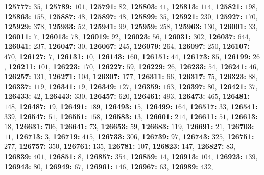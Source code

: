 \textsf{\bfseries 125777:} $35$, \textsf{\bfseries 125789:} $101$, \textsf{\bfseries 125791:} $82$, \textsf{\bfseries 125803:} $41$, \textsf{\bfseries 125813:} $114$, \textsf{\bfseries 125821:} $198$, \textsf{\bfseries 125863:} $155$, \textsf{\bfseries 125887:} $48$, \textsf{\bfseries 125897:} $48$, \textsf{\bfseries 125899:} $35$, \textsf{\bfseries 125921:} $230$, \textsf{\bfseries 125927:} $170$, \textsf{\bfseries 125929:} $378$, \textsf{\bfseries 125933:} $52$, \textsf{\bfseries 125941:} $99$, \textsf{\bfseries 125959:} $258$, \textsf{\bfseries 125963:} $130$, \textsf{\bfseries 126001:} $33$, \textsf{\bfseries 126011:} $7$, \textsf{\bfseries 126013:} $78$, \textsf{\bfseries 126019:} $92$, \textsf{\bfseries 126023:} $56$, \textsf{\bfseries 126031:} $302$, \textsf{\bfseries 126037:} $644$, \textsf{\bfseries 126041:} $237$, \textsf{\bfseries 126047:} $30$, \textsf{\bfseries 126067:} $245$, \textsf{\bfseries 126079:} $264$, \textsf{\bfseries 126097:} $250$, \textsf{\bfseries 126107:} $470$, \textsf{\bfseries 126127:} $7$, \textsf{\bfseries 126131:} $10$, \textsf{\bfseries 126143:} $160$, \textsf{\bfseries 126151:} $44$, \textsf{\bfseries 126173:} $85$, \textsf{\bfseries 126199:} $26$, \textsf{\bfseries 126211:} $101$, \textsf{\bfseries 126223:} $170$, \textsf{\bfseries 126227:} $59$, \textsf{\bfseries 126229:} $26$, \textsf{\bfseries 126233:} $54$, \textsf{\bfseries 126241:} $46$, \textsf{\bfseries 126257:} $131$, \textsf{\bfseries 126271:} $104$, \textsf{\bfseries 126307:} $177$, \textsf{\bfseries 126311:} $66$, \textsf{\bfseries 126317:} $75$, \textsf{\bfseries 126323:} $88$, \textsf{\bfseries 126337:} $119$, \textsf{\bfseries 126341:} $19$, \textsf{\bfseries 126349:} $127$, \textsf{\bfseries 126359:} $163$, \textsf{\bfseries 126397:} $80$, \textsf{\bfseries 126421:} $37$, \textsf{\bfseries 126433:} $42$, \textsf{\bfseries 126443:} $330$, \textsf{\bfseries 126457:} $620$, \textsf{\bfseries 126461:} $493$, \textsf{\bfseries 126473:} $465$, \textsf{\bfseries 126481:} $148$, \textsf{\bfseries 126487:} $19$, \textsf{\bfseries 126491:} $189$, \textsf{\bfseries 126493:} $15$, \textsf{\bfseries 126499:} $164$, \textsf{\bfseries 126517:} $33$, \textsf{\bfseries 126541:} $339$, \textsf{\bfseries 126547:} $51$, \textsf{\bfseries 126551:} $158$, \textsf{\bfseries 126583:} $13$, \textsf{\bfseries 126601:} $214$, \textsf{\bfseries 126611:} $51$, \textsf{\bfseries 126613:} $18$, \textsf{\bfseries 126631:} $706$, \textsf{\bfseries 126641:} $73$, \textsf{\bfseries 126653:} $59$, \textsf{\bfseries 126683:} $119$, \textsf{\bfseries 126691:} $21$, \textsf{\bfseries 126703:} $11$, \textsf{\bfseries 126713:} $3$, \textsf{\bfseries 126719:} $415$, \textsf{\bfseries 126733:} $306$, \textsf{\bfseries 126739:} $97$, \textsf{\bfseries 126743:} $325$, \textsf{\bfseries 126751:} $277$, \textsf{\bfseries 126757:} $350$, \textsf{\bfseries 126761:} $135$, \textsf{\bfseries 126781:} $107$, \textsf{\bfseries 126823:} $147$, \textsf{\bfseries 126827:} $83$, \textsf{\bfseries 126839:} $401$, \textsf{\bfseries 126851:} $8$, \textsf{\bfseries 126857:} $354$, \textsf{\bfseries 126859:} $14$, \textsf{\bfseries 126913:} $104$, \textsf{\bfseries 126923:} $139$, \textsf{\bfseries 126943:} $80$, \textsf{\bfseries 126949:} $67$, \textsf{\bfseries 126961:} $146$, \textsf{\bfseries 126967:} $63$, \textsf{\bfseries 126989:} $432$, 
